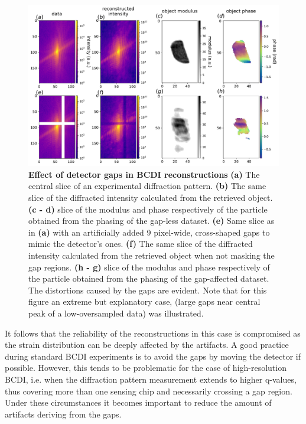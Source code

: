 \begin{figure}[h]
    \includegraphics[width=\textwidth]{figures/Inpainting/gaps_intropdf.pdf}
    \caption{\textbf{Effect of detector gaps in BCDI reconstructions} 
    \textbf{(a)} The central slice of an experimental diffraction pattern. \textbf{(b)} The same slice of the diffracted
    intensity calculated from the retrieved object. \textbf{(c - d)} slice of the modulus and phase respectively of the particle
    obtained from the phasing of the gap-less dataset. \textbf{(e)} Same slice as in \textbf{(a)} with an artificially added
    9 pixel-wide, cross-shaped gaps to mimic the detector's ones. \textbf{(f)} The same slice of the diffracted
    intensity calculated from the retrieved object when not masking the gap regions. \textbf{(h - g)} slice of the modulus and phase respectively of the particle
    obtained from the phasing of the gap-affected dataset. The distortions caused by the gaps are evident. Note that for 
    this figure an extreme but explanatory case, (large gaps near central peak of a low-oversampled data) was illustrated. }
    \label{fig:gap_intro}
    \end{figure}


It follows that the reliability of the reconstructions in this case is 
compromised as the strain distribution can be deeply affected by the artifacts. A good practice during standard BCDI experiments
is to avoid the gaps by moving the detector if possible. However, this tends to be problematic for the case of high-resolution BCDI, 
i.e. when the diffraction pattern measurement extends to higher q-values, thus covering more than one sensing 
chip and necessarily crossing a gap region. Under these circumstances it becomes important to reduce the amount of
artifacts deriving from the gaps. 


